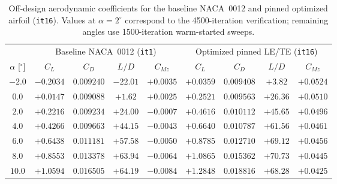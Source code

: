 \documentclass[11pt,a4paper]{article}
\begin{document}
\begin{table}[H]
\centering
\small
\setlength{\tabcolsep}{5pt}
\caption{Off-design aerodynamic coefficients for the baseline NACA~0012 and pinned optimized airfoil (\texttt{it16}). Values at $\alpha = 2^\circ$ correspond to the 4500-iteration verification; remaining angles use 1500-iteration warm-started sweeps.}
\label{tab:offdesign}
\begin{tabular}{ccccccccc}
\toprule
& \multicolumn{4}{c}{Baseline NACA~0012 (\texttt{it1})} & \multicolumn{4}{c}{Optimized pinned LE/TE (\texttt{it16})} \\
\cmidrule(lr){2-5} \cmidrule(lr){6-9}
$\alpha$ [$^\circ$] & $C_L$ & $C_D$ & $L/D$ & $C_{Mz}$ & $C_L$ & $C_D$ & $L/D$ & $C_{Mz}$ \\
\midrule
$-2.0$ & $-0.2034$ & $0.009240$ & $-22.01$ & $+0.0035$ & $+0.0359$ & $0.009408$ & $+3.82$  & $+0.0524$ \\
$0.0$  & $+0.0147$ & $0.009088$ & $+1.62$  & $+0.0025$ & $+0.2521$ & $0.009563$ & $+26.36$ & $+0.0510$ \\
$2.0$  & $+0.2216$ & $0.009234$ & $+24.00$ & $-0.0007$ & $+0.4616$ & $0.010112$ & $+45.65$ & $+0.0496$ \\
$4.0$  & $+0.4266$ & $0.009663$ & $+44.15$ & $-0.0043$ & $+0.6640$ & $0.010787$ & $+61.56$ & $+0.0461$ \\
$6.0$  & $+0.6438$ & $0.011181$ & $+57.58$ & $-0.0050$ & $+0.8785$ & $0.012710$ & $+69.12$ & $+0.0456$ \\
$8.0$  & $+0.8553$ & $0.013378$ & $+63.94$ & $-0.0064$ & $+1.0865$ & $0.015362$ & $+70.73$ & $+0.0445$ \\
$10.0$ & $+1.0594$ & $0.016505$ & $+64.19$ & $-0.0084$ & $+1.2848$ & $0.018816$ & $+68.28$ & $+0.0425$ \\
\bottomrule
\end{tabular}
\end{table}
\end{document}
